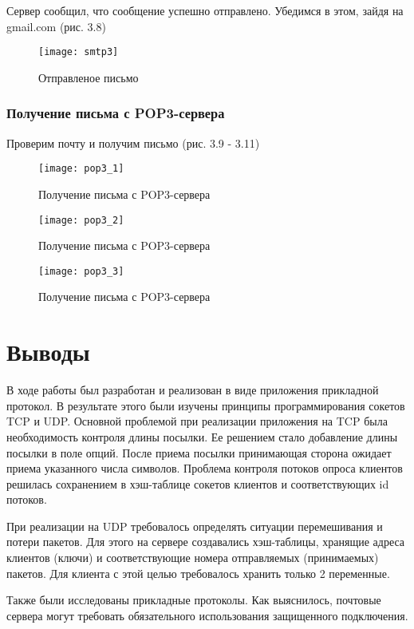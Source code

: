 Сервер сообщил, что сообщение успешно отправлено. Убедимся в этом, зайдя на gmail.com (рис. 3.8)

\begin{figure}[H]
	\begin{center}
		\texttt{[image: smtp3]}
		\caption{Отправленое письмо} 
		\label{pic:pic_name} %
	\end{center}
\end{figure}

\subsubsection{Получение письма с POP3-сервера}

Проверим почту и получим письмо (рис. 3.9 - 3.11)

\begin{figure}[H]
	\begin{center}
		\texttt{[image: pop3\_1]}
		\caption{Получение письма с POP3-сервера} 
		\label{pic:pic_name} %
	\end{center}
\end{figure}

\begin{figure}[H]
	\begin{center}
		\texttt{[image: pop3\_2]}
		\caption{Получение письма с POP3-сервера} 
		\label{pic:pic_name} %
	\end{center}
\end{figure}

\begin{figure}[H]
	\begin{center}
		\texttt{[image: pop3\_3]}
		\caption{Получение письма с POP3-сервера} 
		\label{pic:pic_name} %
	\end{center}
\end{figure}

\section{Выводы}

В ходе работы был разработан и реализован в виде приложения прикладной протокол. В результате этого были изучены принципы программирования сокетов TCP и UDP. Основной проблемой при реализации приложения на TCP была необходимость контроля длины посылки. Ее решением стало добавление длины посылки в поле опций. После приема посылки принимающая сторона ожидает приема указанного числа символов. Проблема контроля потоков опроса клиентов решилась сохранением в хэш-таблице сокетов клиентов и соответствующих id потоков.

При реализации на UDP требовалось определять ситуации перемешивания и потери пакетов. Для этого на сервере создавались хэш-таблицы, хранящие адреса клиентов (ключи) и соответствующие номера отправляемых (принимаемых) пакетов. Для клиента с этой целью требовалось хранить только 2 переменные.

Также были исследованы прикладные протоколы. Как выяснилось, почтовые сервера могут требовать обязательного использования защищенного подключения.

